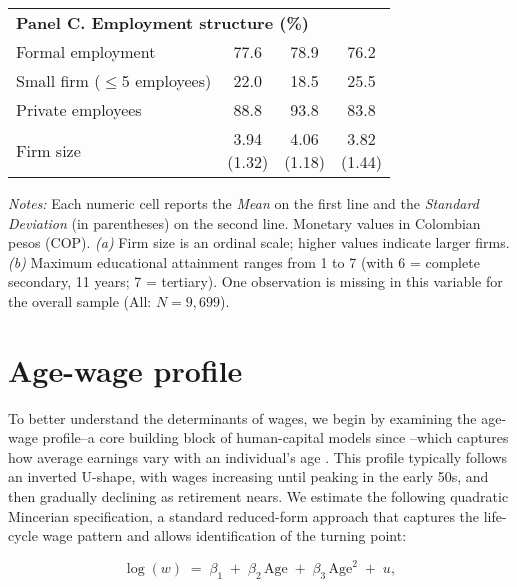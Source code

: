 \documentclass[12pt,a4paper,onecolumn]{article}
\begin{document}
\begin{table}[h!]
{\begin{threeparttable}
\begin{tabular}{lccc}
\multicolumn{4}{l}{\textbf{Panel C. Employment structure (\%)}} \\
 \addlinespace[6pt]
Formal employment & 77.6 & 78.9 & 76.2 \\
\addlinespace[4pt]
Small firm ($\leq$5 employees) & 22.0 & 18.5 & 25.5 \\
\addlinespace[4pt]
Private employees & 88.8 & 93.8 & 83.8 \\
Firm size\tnote{b} & \makecell{3.94 \\ (1.32)} & \makecell{4.06 \\ (1.18)} & \makecell{3.82 \\ (1.44)} \\


  
\bottomrule
\end{tabular}

\begin{flushleft}\footnotesize
\textit{Notes:} Each numeric cell reports the \textit{Mean} on the first line and the \textit{Standard Deviation} (in parentheses) on the second line. Monetary values in Colombian pesos (COP). \textit{(a)} Firm size is an ordinal scale; higher values indicate larger firms. \textit{(b)} Maximum educational attainment ranges from 1 to 7 (with 6 = complete secondary, 11 years; 7 = tertiary). One observation is missing in this variable for the overall sample (All: $N=9{,}699$).
\end{flushleft}
\end{threeparttable}
}
\end{table}



\section{Age-wage profile}

To better understand the determinants of wages, we begin by examining the age-wage profile--a core building block of human-capital models since \citet{Mincer1974}--which captures how average earnings vary with an individual's age \citep{Startz2014}. This profile typically follows an inverted U-shape, with wages increasing until peaking in the early 50s, and then gradually declining as retirement nears. 
We estimate the following quadratic Mincerian specification, a standard reduced-form approach that captures the life-cycle wage pattern and allows identification of the turning point:

\begin{equation}
\log(w) \;=\; \beta_1 \;+\; \beta_2\,\text{Age} \;+\; \beta_3\,\text{Age}^2 \;+\; u,
\end{equation}
\end{document}
